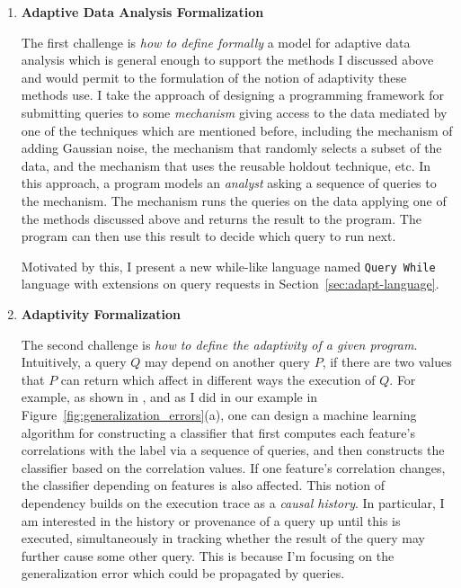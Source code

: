 \begin{enumerate}
 \item
 \textbf{Adaptive Data Analysis Formalization}

The first challenge is \emph{how to define formally} a model for adaptive data analysis which is general enough to support the methods I discussed above and would permit to the formulation of the notion of adaptivity these methods use. 
I take the approach of designing a programming framework for submitting queries to some \emph{mechanism} giving access 
to the data mediated by one of the techniques which are mentioned before, 
including the mechanism of adding Gaussian noise, 
the mechanism that randomly selects a subset of the data, 
and the mechanism that uses the reusable holdout technique, etc. 
In this approach, a program models an \emph{analyst} asking a sequence of queries to the mechanism. 
The mechanism runs the queries on the data applying one of the methods discussed above and returns the result to the program. The program can then use this result to decide which query to run next. 

Motivated by this, I present a new while-like language 
named {\tt Query While} language with extensions on query requests in Section~\ref{sec:adapt-language}.

\item 
\textbf{Adaptivity Formalization}

The second challenge is \emph{how to define the adaptivity of a given program}.
Intuitively, a query $Q$ may depend on another query $P$, if there are two values that $P$ can return which affect in different ways the execution of $Q$. 
For example, as shown in \cite{dwork2015reusable}, and as I did in our example in Figure~\ref{fig:generalization_errors}(a), one can design a machine learning algorithm for constructing a classifier that first computes each feature's correlations with the label via a sequence of queries, and then constructs the classifier based on the correlation values. 
If one feature's correlation changes, the classifier depending on features is also affected. 
This notion of dependency builds on the execution trace as a \emph{causal history}. 
In particular, I am interested in the history or provenance of a query up until this is executed, 
simultaneously in tracking whether the result of the query may further cause some other query. 
This is because I'm focusing on the generalization error which could be propagated by queries.


\end{enumerate}
